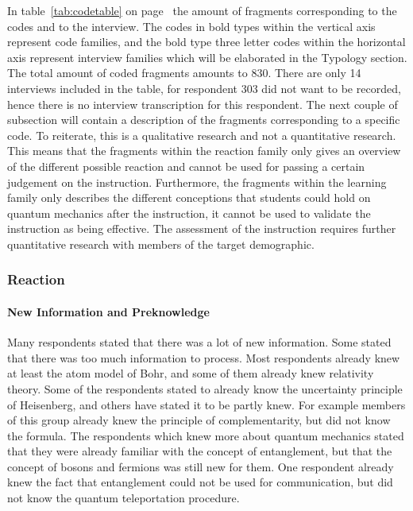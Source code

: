 \documentclass[11pt,twoside]{report} %
\begin{document}
In table~\ref{tab:codetable} on page~\pageref{tab:codetable} the amount of fragments corresponding to the codes and to the interview. The codes in bold types within the vertical axis represent code families, and the bold type three letter codes within the horizontal axis represent interview families which will be elaborated in the Typology section. The total amount of coded fragments amounts to 830. There are only 14 interviews included in the table, for respondent 303 did not want to be recorded, hence there is no interview transcription for this respondent. The next couple of subsection will contain a description of the fragments corresponding to a specific code. To reiterate, this is a qualitative research and not a quantitative research. This means that the fragments within the reaction family only gives an overview of the different possible reaction and cannot be used for passing a certain judgement on the instruction. Furthermore, the fragments within the learning family only describes the different conceptions that students could hold on quantum mechanics after the instruction, it cannot be used to validate the instruction as being effective. The assessment of the instruction requires further quantitative research with members of the target demographic.

\subsubsection{Reaction}

\paragraph{New Information and Preknowledge}

Many respondents stated that there was a lot of new information. Some stated that there was too much information to process. Most respondents already knew at least the atom model of Bohr, and some of them already knew relativity theory. Some of the respondents stated to already know the uncertainty principle of Heisenberg, and others have stated it to be partly knew. For example members of this group already knew the principle of complementarity, but did not know the formula. The respondents which knew more about quantum mechanics stated that they were already familiar with the concept of entanglement, but that the concept of bosons and fermions was still new for them. One respondent already knew the fact that entanglement could not be used for communication, but did not know the quantum teleportation procedure.
\end{document}
